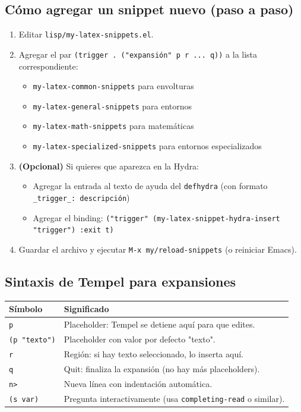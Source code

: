 \documentclass[11pt]{article}
\begin{document}
\subsection{Cómo agregar un snippet nuevo (paso a paso)}
\label{sec:org9aa4846}

\begin{enumerate}
\item Editar \texttt{lisp/my-latex-snippets.el}.
\item Agregar el par \texttt{(trigger . ("expansión" p r ... q))} a la lista correspondiente:
\begin{itemize}
\item \texttt{my-latex-common-snippets} para envolturas
\item \texttt{my-latex-general-snippets} para entornos
\item \texttt{my-latex-math-snippets} para matemáticas
\item \texttt{my-latex-specialized-snippets} para entornos especializados
\end{itemize}
\item \textbf{(Opcional)} Si quieres que aparezca en la Hydra:
\begin{itemize}
\item Agregar la entrada al texto de ayuda del \texttt{defhydra} (con formato \texttt{\_trigger\_: descripción})
\item Agregar el binding: \texttt{("trigger" (my-latex-snippet-hydra-insert "trigger") :exit t)}
\end{itemize}
\item Guardar el archivo y ejecutar \texttt{M-x my/reload-snippets} (o reiniciar Emacs).
\end{enumerate}
\subsection{Sintaxis de Tempel para expansiones}
\label{sec:org0b7e207}

\begin{center}
\begin{tabular}{ll}
Símbolo & Significado\\
\hline
\texttt{p} & Placeholder: Tempel se detiene aquí para que edites.\\
\texttt{(p "texto")} & Placeholder con valor por defecto "texto".\\
\texttt{r} & Región: si hay texto seleccionado, lo inserta aquí.\\
\texttt{q} & Quit: finaliza la expansión (no hay más placeholders).\\
\texttt{n>} & Nueva línea con indentación automática.\\
\texttt{(s var)} & Pregunta interactivamente (usa \texttt{completing-read} o similar).\\
\end{tabular}
\end{center}
\end{document}
